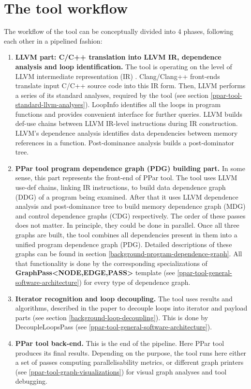 \section{The tool workflow} \label{ppar-tool-workflow}
\qquad The workflow of the tool can be conceptually divided into 4 phases, following each other in a pipelined fashion:
\begin{enumerate}[align=left,leftmargin=*]
\item \textbf{LLVM part: C/C++ translation into LLVM IR, dependence analysis and loop identification.} The tool is operating on the level of LLVM intermediate representation (IR) \cite{llvm-online-docs-ir}. Clang/Clang++ front-ends translate input C/C++ source code into this IR form. Then, LLVM performs a series of its standard analyses, required by the tool (see section \ref{ppar-tool-standard-llvm-analyses}). LoopInfo identifies all the loops in program functions and provides convenient interface for further queries. LLVM builds def-use chains between LLVM IR-level instructions during IR construction. LLVM's dependence analysis identifies data dependencies between memory references in a function. Post-dominance analysis builds a post-dominator tree.
	
\item \textbf{PPar tool program dependence graph (PDG) building part.} In some sense, this part represents the front-end of PPar tool. The tool uses LLVM use-def chains, linking IR instructions, to build data dependence graph (DDG) of a program being examined. After that it uses LLVM dependence analysis and post-dominance tree to build memory dependence graph (MDG) and control dependence graphs (CDG) respectively. The order of these passes does not matter. In principle, they could be done in parallel. Once all three graphs are built, the tool combines all dependencies present in them into a unified program dependence graph (PDG). Detailed descriptions of these graphs can be found in section \ref{background-program-dependence-graph}. All that functionality is done by the corresponding specializations of \textbf{GraphPass\textless NODE,EDGE,PASS\textgreater} template (see \ref{ppar-tool-general-software-architecture}) for every type of dependence graph.   

\item \textbf{Iterator recognition and loop decoupling.} The tool uses results and algorithms, described in the paper \cite{iterator-recognition-paper} to decouple loops into iterator and payload parts (see section \ref{background-loop-decoupling}). This is done by DecoupleLoopsPass (see \ref{ppar-tool-general-software-architecture}).

\item \textbf{PPar tool back-end.} This is the end of the pipeline. Here PPar tool produces its final results. Depending on the purpose, the tool runs here either a set of passes computing parallelisability metrics, or different graph printers (see \ref{ppar-tool-graph-visualizations}) for visual graph analyses and tool debugging. 
		  
\end{enumerate}

